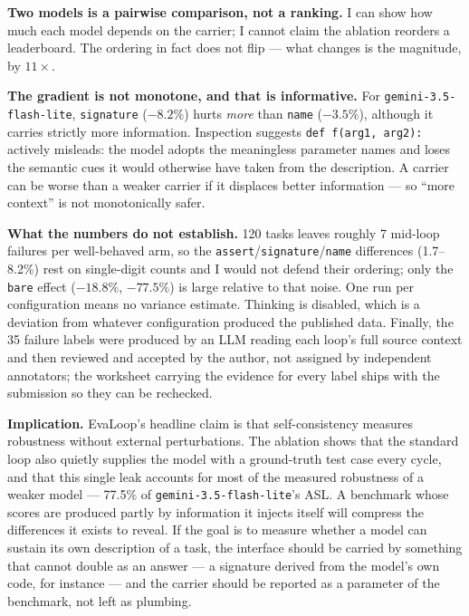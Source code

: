 \documentclass[10pt]{article}
\newcommand{\code}[1]{\texttt{\small #1}}
\begin{document}
\textbf{Two models is a pairwise comparison, not a ranking.} I can show how
much each model depends on the carrier; I cannot claim the ablation reorders a
leaderboard. The ordering in fact does not flip --- what changes is the
magnitude, by $11\times$.

\textbf{The gradient is not monotone, and that is informative.} For
\code{gemini-3.5-flash-lite}, \code{signature} ($-8.2\%$) hurts \emph{more}
than \code{name} ($-3.5\%$), although it carries strictly more information.
Inspection suggests \code{def f(arg1, arg2):} actively misleads: the model
adopts the meaningless parameter names and loses the semantic cues it would
otherwise have taken from the description. A carrier can be worse than a weaker
carrier if it displaces better information --- so ``more context'' is not
monotonically safer.

\textbf{What the numbers do not establish.} 120 tasks leaves roughly 7 mid-loop
failures per well-behaved arm, so the \code{assert}/\code{signature}/\code{name}
differences (1.7--8.2\%) rest on single-digit counts and I would not defend
their ordering; only the \code{bare} effect ($-18.8\%$, $-77.5\%$) is large
relative to that noise. One run per configuration means no variance estimate.
Thinking is disabled, which is a deviation from whatever configuration produced
the published data. Finally, the 35 failure labels were produced by an LLM
reading each loop's full source context and then reviewed and accepted by the
author, not assigned by independent annotators; the worksheet carrying the
evidence for every label ships with the submission so they can be rechecked.

\textbf{Implication.} EvaLoop's headline claim is that self-consistency
measures robustness without external perturbations. The ablation shows that the
standard loop also quietly supplies the model with a ground-truth test case
every cycle, and that this single leak accounts for most of the measured
robustness of a weaker model --- 77.5\% of \code{gemini-3.5-flash-lite}'s ASL.
A benchmark whose scores are produced partly by information it injects itself
will compress the differences it exists to reveal. If the goal is to measure
whether a model can sustain its own description of a task, the interface should
be carried by something that cannot double as an answer --- a signature derived
from the model's own code, for instance --- and the carrier should be reported
as a parameter of the benchmark, not left as plumbing.
\end{document}

